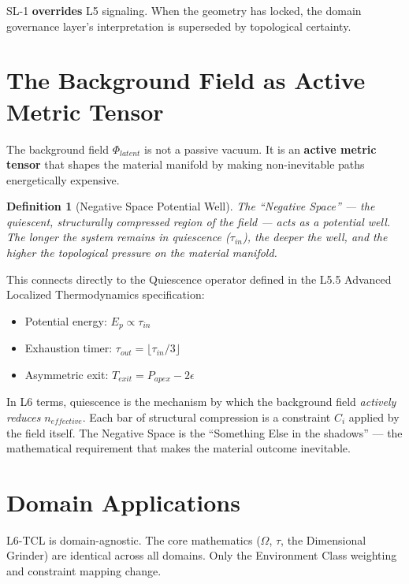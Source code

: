 \documentclass[11pt, a4paper]{article}
\newtheorem{definition}{Definition}[section]
\begin{document}
SL-1 \textbf{overrides} L5 signaling. When the geometry has locked, the
domain governance layer's interpretation is superseded by topological
certainty.

\section{The Background Field as Active Metric Tensor}

The background field $\Phi_{latent}$ is not a passive vacuum. It is an
\textbf{active metric tensor} that shapes the material manifold by making
non-inevitable paths energetically expensive.

\begin{definition}[Negative Space Potential Well]
The ``Negative Space'' --- the quiescent, structurally compressed region
of the field --- acts as a potential well. The longer the system remains
in quiescence ($\tau_{in}$), the deeper the well, and the higher the
topological pressure on the material manifold.
\end{definition}

This connects directly to the Quiescence operator defined in the L5.5
Advanced Localized Thermodynamics specification:
\begin{itemize}[nosep]
  \item Potential energy: $E_p \propto \tau_{in}$
  \item Exhaustion timer: $\tau_{out} = \lfloor \tau_{in} / 3 \rfloor$
  \item Asymmetric exit: $T_{exit} = P_{apex} - 2\epsilon$
\end{itemize}

In L6 terms, quiescence is the mechanism by which the background field
\textit{actively reduces} $n_{effective}$. Each bar of structural
compression is a constraint $C_i$ applied by the field itself. The
Negative Space is the ``Something Else in the shadows'' --- the
mathematical requirement that makes the material outcome inevitable.

\section{Domain Applications}

L6-TCL is domain-agnostic. The core mathematics ($\Omega$, $\tau$, the
Dimensional Grinder) are identical across all domains. Only the
Environment Class weighting and constraint mapping change.
\end{document}
